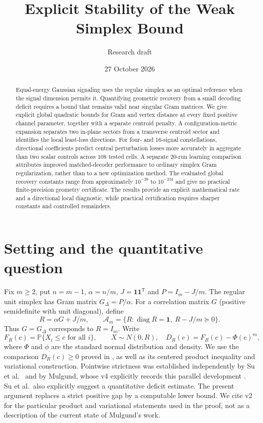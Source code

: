 \documentclass[11pt]{article}
\title{Explicit Stability of the Weak Simplex Bound}
\author{Research draft}
\date{27 October 2026}
\theoremstyle{remark}\newtheorem{remark}[theorem]{Remark}
\newcommand{\Pp}{\mathbb P}
\newcommand{\one}{\mathbf 1}
\newcommand{\diag}{\operatorname{diag}}
\begin{document}
\maketitle
\begin{abstract}
Equal-energy Gaussian signaling uses the regular simplex as an optimal reference
when the signal dimension permits it. Quantifying geometric recovery from a
small decoding deficit requires a bound that remains valid near singular
Gram matrices. We give explicit global quadratic bounds for Gram and vertex
distance at every fixed positive channel parameter, together with a separate
centroid penalty. A configuration-metric expansion separates two in-plane
sectors from a transverse centroid sector and identifies the local least-loss
directions. For four- and 16-signal constellations, directional coefficients
predict central perturbation losses more accurately in aggregate than two
scalar controls across 108 tested cells. A separate 20-run learning comparison
attributes improved matched-decoder performance to ordinary simplex Gram
regularization, rather than to a new optimization method. The evaluated global
recovery constants range from approximately $10^{-39}$ to $10^{-234}$ and
give no practical finite-precision geometry certificate. The results provide
an explicit mathematical rate and a directional local diagnostic, while
practical certification requires sharper constants and controlled remainders.
\end{abstract}

\section{Setting and the quantitative question}
Fix $m\ge2$, put $n=m-1$, $\alpha=n/m$, $J=\one\one^{\mathsf T}$ and
$P=I_m-J/m$. The regular unit simplex has Gram matrix $G_\Delta=P/\alpha$.
For a correlation matrix $G$ (positive semidefinite with unit diagonal), define
\begin{equation}\label{eq:normalization}
 R=\alpha G+J/m,\qquad
 \mathcal A_m=\{R:\diag R=\one,\ R-J/m\succeq0\}.
\end{equation}
Thus $G=G_\Delta$ corresponds to $R=I_m$. Write
\[
 F_R(c)=\Pp\{X_i\le c\text{ for all }i\},\qquad X\sim N(0,R),
 \quad D_R(c)=F_R(c)-\Phi(c)^m,
\]
where $\Phi$ and $\phi$ are the standard normal distribution and density.
We use the comparison $D_R(c)\ge0$ proved in \cite{Mulgund}, as well as its
centered product inequality and variational construction. Pointwise strictness was established independently by Su et al.\ \cite{Su}
and by Mulgund, whose v4 explicitly records this parallel development
\cite[Remark 2.3 and Appendix B]{MulgundLatest}. Su et al.\ also explicitly
suggest a quantitative deficit estimate. The present argument replaces a
strict positive gap by a computable lower bound. We cite v2 for the particular
product and variational statements used in the proof, not as a description
of the current state of Mulgund's work.
\end{document}
